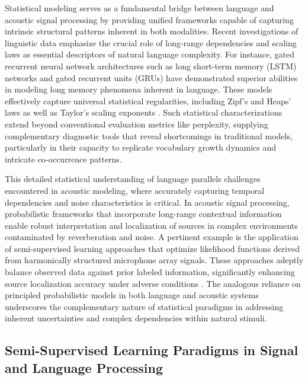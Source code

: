 \documentclass[11pt]{article}
\begin{document}
Statistical modeling serves as a fundamental bridge between language and acoustic signal processing by providing unified frameworks capable of capturing intrinsic structural patterns inherent in both modalities. Recent investigations of linguistic data emphasize the crucial role of long-range dependencies and scaling laws as essential descriptors of natural language complexity. For instance, gated recurrent neural network architectures such as long short-term memory (LSTM) networks and gated recurrent units (GRUs) have demonstrated superior abilities in modeling long memory phenomena inherent in language. These models effectively capture universal statistical regularities, including Zipf’s and Heaps’ laws as well as Taylor’s scaling exponents \cite{ref51}. Such statistical characterizations extend beyond conventional evaluation metrics like perplexity, supplying complementary diagnostic tools that reveal shortcomings in traditional models, particularly in their capacity to replicate vocabulary growth dynamics and intricate co-occurrence patterns.

This detailed statistical understanding of language parallels challenges encountered in acoustic modeling, where accurately capturing temporal dependencies and noise characteristics is critical. In acoustic signal processing, probabilistic frameworks that incorporate long-range contextual information enable robust interpretation and localization of sources in complex environments contaminated by reverberation and noise. A pertinent example is the application of semi-supervised learning approaches that optimize likelihood functions derived from harmonically structured microphone array signals. These approaches adeptly balance observed data against prior labeled information, significantly enhancing source localization accuracy under adverse conditions \cite{ref52}. The analogous reliance on principled probabilistic models in both language and acoustic systems underscores the complementary nature of statistical paradigms in addressing inherent uncertainties and complex dependencies within natural stimuli.

\subsection{Semi-Supervised Learning Paradigms in Signal and Language Processing}
\end{document}
